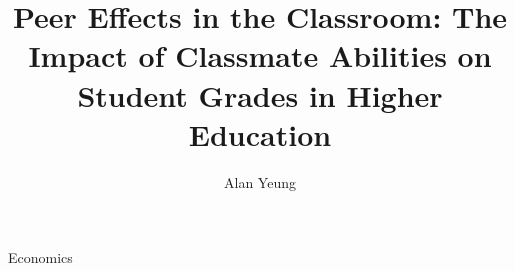 \title{Peer Effects in the Classroom: The Impact of Classmate Abilities on Student Grades in Higher Education}

\author{Alan Yeung}


\clearpage{}

\begin{center}
  \Large \thetitle \par
  \vspace{.25cm}
  \large \theauthor \par
  \vspace{.25cm}
  \large \thedate \par
  \vspace{.25cm}
  \large Economics
\end{center}

